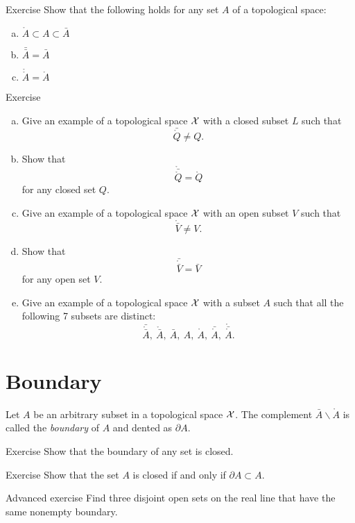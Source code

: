 \begin{thm}{Exercise}
Show that the following holds for any set $A$ of a topological space:
\begin{enumerate}[(a)]
\item $\mathring A\subset A\subset \bar A$
\item $\bar{\bar A}=\bar A$ 
\item $\mathring{\mathring A}=\mathring A$
\end{enumerate}
\end{thm}

\begin{thm}{Exercise}
\begin{enumerate}[(a)]
\item Give an example of a topological space $\mathcal{X}$ with a closed subset $L$ such that
 \[\bar{\mathring Q}\ne Q.\]
\item Show that 
\[\mathring{\bar{\mathring Q}}=\mathring Q\]
for any closed set $Q$.
\item Give an example of a topological space $\mathcal{X}$ with an open subset $V$ such that
 \[\mathring{\bar V}\ne V.\]
\item Show that 
\[\bar{\mathring{\bar V}}=\bar V\]
for any open set $V$.
\item Give an example of a topological space $\mathcal{X}$ with a subset $A$ such that all the following 7 subsets are distinct:
\[\bar{\mathring{\bar A}},\ \mathring{\bar A},\ \bar A,\  A,\  \mathring A,\ \bar{\mathring A},\ \mathring{\bar{\mathring A}}.\]
\end{enumerate}

\end{thm}

\section{Boundary}

Let $A$ be an arbitrary subset in a topological space $\mathcal{X}$.
The complement $\bar A\backslash \mathring A$ is called the \emph{boundary} of $A$ and dented as $\partial A$.

\begin{thm}{Exercise}
Show that the boundary of any set is closed.
\end{thm}

\begin{thm}{Exercise}
Show that the set $A$ is closed if and only if $\partial A\subset A$.
\end{thm}

\begin{thm}{Advanced exercise}
Find three disjoint open sets on the real line 
that have the same nonempty boundary.
\end{thm}

